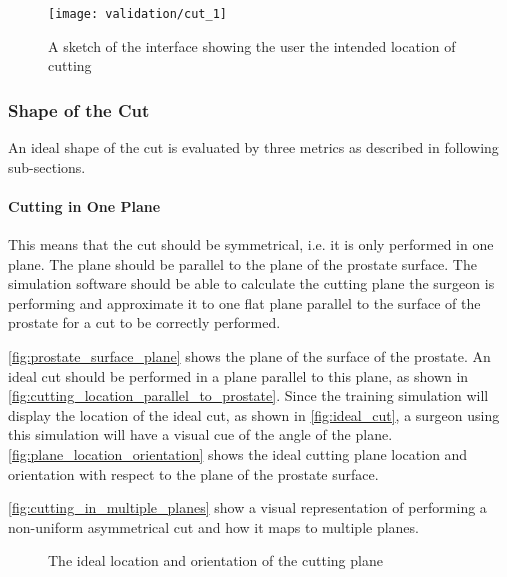 \begin{figure}
  \centering%
  \texttt{[image: validation/cut\_1]}
  \caption{A sketch of the interface showing the user the intended location of cutting}\label{fig:ideal_cut}
\end{figure}

\subsubsection{Shape of the Cut}
An ideal shape of the cut is evaluated by three  metrics as described in following sub-sections.

\paragraph{Cutting in One Plane}\label{par:metric_1}
This means that the cut should be symmetrical, i.e. it is only performed in one plane. The plane should be parallel to the plane of the prostate surface. The simulation software should be able to calculate the cutting plane the surgeon is performing and approximate it to one flat plane parallel to the surface of the prostate for a cut to be correctly performed.

\autoref{fig:prostate_surface_plane} shows the plane of the surface of the prostate. An ideal cut should be performed in a plane parallel to this plane, as shown in \autoref{fig:cutting_location_parallel_to_prostate}. Since the training simulation will display the location of the ideal cut, as shown in \autoref{fig:ideal_cut}, a surgeon using this simulation will have a visual cue of the angle of the plane. \autoref{fig:plane_location_orientation} shows the ideal cutting plane location and orientation with respect to the plane of the prostate surface.

\autoref{fig:cutting_in_multiple_planes} show a visual representation of performing a non-uniform asymmetrical cut and how it maps to multiple planes.

\begin{figure}
  \centering%
  \hfill%
  \hfill%
  \caption{The ideal location and orientation of the cutting plane}\label{fig:plane_location_orientation}
\end{figure}


